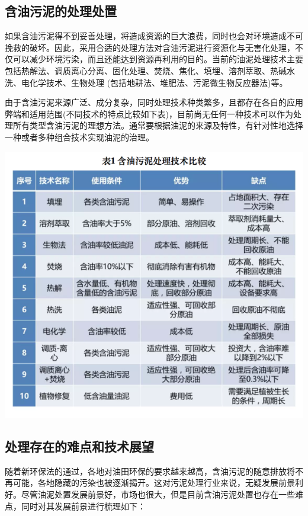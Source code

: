 \documentclass[]{book}
\begin{document}
\subsection{含油污泥的处理处置}

如果含油污泥得不到妥善处理，将造成资源的巨大浪费，同时也会对环境造成不可挽救的破坏。因此，采用合适的处理方法对含油污泥进行资源化与无害化处理，不仅可以减少环境污染，而且还能达到资源再利用的目的。当前的油泥处理技术主要包括热解法、调质离心分离、固化处理、焚烧、焦化、填埋、溶剂萃取、热碱水洗、电化学技术、生物处理
(包括地耕法、堆肥法、污泥微生物反应器法)等。

由于含油污泥来源广泛、成分复杂，同时处理技术种类繁多，且都存在各自的应用弊端和适用范围(不同技术的特点比较如下表)，目前尚无任何一种技术可以作为处理所有类型含油污泥的理想方法。通常要根据油泥的来源及特性，有针对性地选择一种或者多种组合技术实现油泥的治理。

\includegraphics[width=8.33in]{images/youni9}

\subsection{处理存在的难点和技术展望}

随着新环保法的通过，各地对油田环保的要求越来越高，含油污泥的随意排放将不再可能，各地隐藏的污染也被逐渐揭开。这对污泥处理行业来说，无疑发展前景利好。尽管油泥处置发展前景好，市场也很大，但是目前含油污泥处置也存在一些难点，同时对其发展前景进行梳理如下：
\end{document}
